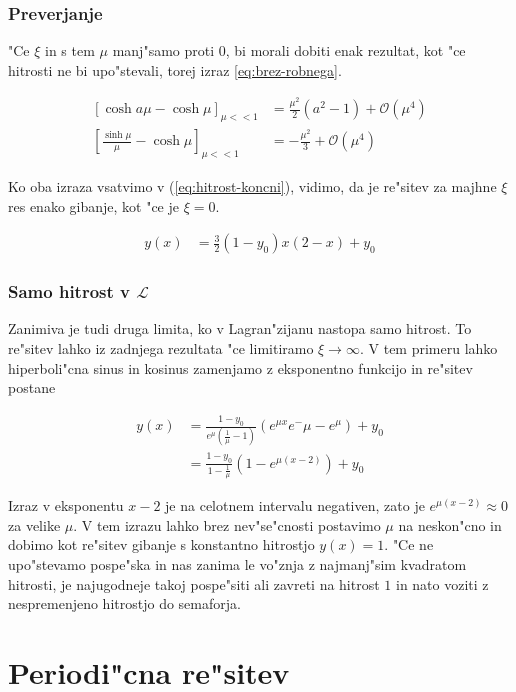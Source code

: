 \documentclass[12pt]{article}
\begin{document}
\subsubsection{Preverjanje}

"Ce $\xi$ in s tem $\mu$ manj"samo proti $0$, bi morali dobiti enak rezultat, kot "ce hitrosti ne bi upo"stevali, torej izraz \ref{eq:brez-robnega}. 

\begin{align}
  \left[\cosh a\mu - \cosh \mu \right]_{\mu << 1} &= \frac{\mu^2}{2} (a^2-1) + \mathcal{O} (\mu^4) \\
  \left[\frac{\sinh\mu}{\mu} - \cosh \mu \right]_{\mu << 1} &= -\frac{\mu^2}{3} + \mathcal{O} (\mu^4)
\end{align}

Ko oba izraza vsatvimo v (\ref{eq:hitrost-koncni}), vidimo, da je re"sitev za majhne $\xi$ res enako gibanje, kot "ce je $\xi=0$. 

\begin{align}
  y(x) &= \frac{3}{2} (1-y_0) x (2-x) + y_0
\end{align}

\subsubsection{Samo hitrost v $\mathcal{L}$}
Zanimiva je tudi druga limita, ko v Lagran"zijanu nastopa samo hitrost. To re"sitev lahko iz zadnjega rezultata "ce limitiramo $\xi\to\infty$. V tem primeru lahko hiperboli"cna sinus in kosinus zamenjamo z eksponentno funkcijo in re"sitev postane

\begin{align}
  y(x) &= \frac{1-y_0}{e^\mu(\frac{1}{\mu} - 1)} (e^{\mu x} e^-\mu - e^\mu) + y_0\\
  &= \frac{1-y_0}{1-\frac{1}{\mu}}(1-e^{\mu(x-2)}) + y_0
\end{align}

Izraz v eksponentu $x-2$ je na celotnem intervalu negativen, zato je $e^{\mu(x-2)} \approx 0$ za velike $\mu$. V tem izrazu lahko brez nev"se"cnosti postavimo $\mu$ na neskon"cno in dobimo kot re"sitev gibanje s konstantno hitrostjo $y(x) = 1$. "Ce ne upo"stevamo pospe"ska in nas zanima le vo"znja z najmanj"sim kvadratom hitrosti, je najugodneje takoj pospe"siti ali zavreti na hitrost $1$ in nato voziti z nespremenjeno hitrostjo do semaforja. 


\section{Periodi"cna re"sitev}
\end{document}
